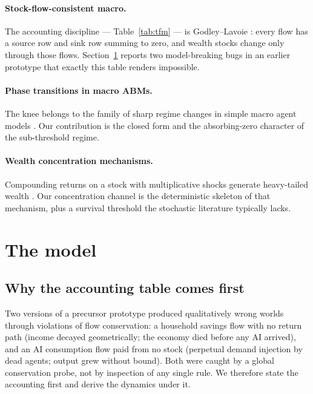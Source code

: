 \documentclass[11pt]{article}
\begin{document}
\paragraph{Stock-flow-consistent macro.} The accounting discipline ---
Table~\ref{tab:tfm} --- is Godley--Lavoie \citep{godley2007monetary}: every
flow has a source row and sink row summing to zero, and wealth stocks change
only through those flows. Section~\ref{sec:model} reports two model-breaking
bugs in an earlier prototype that exactly this table renders impossible.

\paragraph{Phase transitions in macro ABMs.} The knee belongs to the family
of sharp regime changes in simple macro agent models
\citep{gualdi2015tipping}. Our contribution is the closed form and the
absorbing-zero character of the sub-threshold regime.

\paragraph{Wealth concentration mechanisms.} Compounding returns on a stock
with multiplicative shocks generate heavy-tailed wealth
\citep{gabaix2009power, benhabib2011distribution}. Our concentration channel
is the deterministic skeleton of that mechanism, plus a survival threshold
the stochastic literature typically lacks.

\section{The model}\label{sec:model}

\subsection{Why the accounting table comes first}\label{sec:sfc}

Two versions of a precursor prototype produced qualitatively wrong worlds
through violations of flow conservation: a household savings flow with no
return path (income decayed geometrically; the economy died before any AI
arrived), and an AI consumption flow paid from no stock (perpetual demand
injection by dead agents; output grew without bound). Both were caught by a
global conservation probe, not by inspection of any single rule. We therefore
state the accounting first and derive the dynamics under it.
\end{document}
